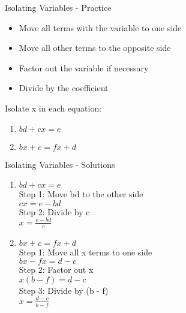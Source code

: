 \documentclass[aspectratio=169]{beamer}
\begin{document}
\begin{frame}{Isolating Variables - Practice}
    \begin{tcolorbox}[colback=lightgray,colframe=primary,title=Key Steps]
        \begin{itemize}
            \item Move all terms with the variable to one side
            \item Move all other terms to the opposite side
            \item Factor out the variable if necessary
            \item Divide by the coefficient
        \end{itemize}
    \end{tcolorbox}
    
    \begin{tcolorbox}[colback=lightgray,colframe=primary,title=Practice Problems]
        Isolate x in each equation:
        \begin{enumerate}
            \item $bd + cx = e$
            \item $bx + c = fx + d$
        \end{enumerate}
    \end{tcolorbox}
\end{frame}

\begin{frame}{Isolating Variables - Solutions}
    \begin{tcolorbox}[colback=lightgray,colframe=accent,title=Detailed Solutions]
        \begin{enumerate}
            \item $bd + cx = e$ \\
                Step 1: Move bd to the other side \\
                $cx = e - bd$ \\
                Step 2: Divide by c \\
                $x = \frac{e - bd}{c}$
            
            \item $bx + c = fx + d$ \\
                Step 1: Move all x terms to one side \\
                $bx - fx = d - c$ \\
                Step 2: Factor out x \\
                $x(b - f) = d - c$ \\
                Step 3: Divide by (b - f) \\
                $x = \frac{d - c}{b - f}$
        \end{enumerate}
    \end{tcolorbox}
\end{frame}
\end{document}
